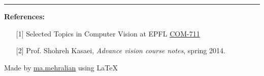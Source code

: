 \documentclass{../cheat}
\begin{document}
\begin{multicols}{3}
	
\vspace{5mm}
\rule{0.3\linewidth}{0.25pt}
\scriptsize

\textbf{References:}
\begin{itemize}[leftmargin=2em]
	\item [{[1]}] Selected Topics in Computer Vision at EPFL  \href{http://cvlab.epfl.ch/teaching/topics/}{\url{COM-711}}
	\item [{[2]}] Prof. Shohreh Kasaei, \textit{Advance vision course notes}, spring 2014.
\end{itemize}
Made by \href{http://webpages.iust.ac.ir/mehralian/}{ma.mehralian} using \LaTeX
\end{multicols}
\end{document}
